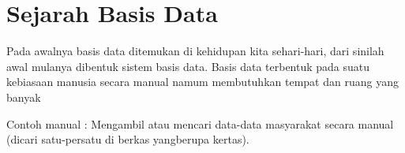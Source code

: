 \documentclass{article}
\begin{document}
\section { Sejarah Basis Data}
     Pada awalnya basis data ditemukan di kehidupan kita sehari-hari, dari sinilah awal mulanya dibentuk sistem basis data. Basis data terbentuk pada suatu kebiasaan manusia secara manual namum membutuhkan tempat dan ruang yang banyak
\vspace{0,5cm}
\par Contoh manual :
Mengambil atau mencari data-data masyarakat secara manual (dicari satu-persatu di berkas yangberupa kertas).
\end{document}
